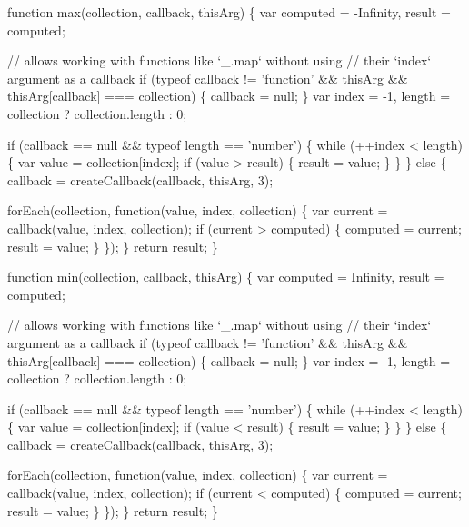 \begin{DoxyCodeInclude}
{{  \textcolor{keyword}{function} max(collection, callback, thisArg) \{
    var computed = -Infinity,
        result = computed;

    \textcolor{comment}{// allows working with functions like `\_.map` without using}
    \textcolor{comment}{// their `index` argument as a callback}
    \textcolor{keywordflow}{if} (typeof callback != \textcolor{stringliteral}{'function'} && thisArg && thisArg[callback] === collection) \{
      callback = null;
    \}
    var index = -1,
        length = collection ? collection.length : 0;

    \textcolor{keywordflow}{if} (callback == null && typeof length == \textcolor{stringliteral}{'number'}) \{
      \textcolor{keywordflow}{while} (++index < length) \{
        var value = collection[index];
        \textcolor{keywordflow}{if} (value > result) \{
          result = value;
        \}
      \}
    \} \textcolor{keywordflow}{else} \{
      callback = createCallback(callback, thisArg, 3);

      forEach(collection, \textcolor{keyword}{function}(value, index, collection) \{
        var current = callback(value, index, collection);
        \textcolor{keywordflow}{if} (current > computed) \{
          computed = current;
          result = value;
        \}
      \});
    \}
    \textcolor{keywordflow}{return} result;
  \}

  \textcolor{keyword}{function} min(collection, callback, thisArg) \{
    var computed = Infinity,
        result = computed;

    \textcolor{comment}{// allows working with functions like `\_.map` without using}
    \textcolor{comment}{// their `index` argument as a callback}
    \textcolor{keywordflow}{if} (typeof callback != \textcolor{stringliteral}{'function'} && thisArg && thisArg[callback] === collection) \{
      callback = null;
    \}
    var index = -1,
        length = collection ? collection.length : 0;

    \textcolor{keywordflow}{if} (callback == null && typeof length == \textcolor{stringliteral}{'number'}) \{
      \textcolor{keywordflow}{while} (++index < length) \{
        var value = collection[index];
        \textcolor{keywordflow}{if} (value < result) \{
          result = value;
        \}
      \}
    \} \textcolor{keywordflow}{else} \{
      callback = createCallback(callback, thisArg, 3);

      forEach(collection, \textcolor{keyword}{function}(value, index, collection) \{
        var current = callback(value, index, collection);
        \textcolor{keywordflow}{if} (current < computed) \{
          computed = current;
          result = value;
        \}
      \});
    \}
    \textcolor{keywordflow}{return} result;
  \}

}}
\end{DoxyCodeInclude}
